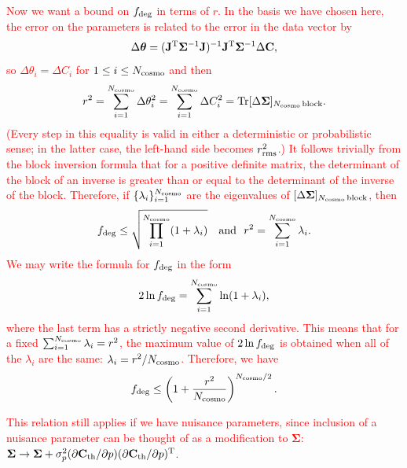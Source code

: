 \documentclass[usenatbib]{mnras}
\newcommand{\changetext}[1]{\textcolor{red}{#1}}
\begin{document}
\changetext{Now we want a bound on $f_{\rm deg}$ in terms of $r$. In the basis we have chosen here, the error on the parameters is related to the error in the data vector by
\begin{equation}
\Delta{\boldsymbol\theta} = ({\bf J}^{\rm T}{\boldsymbol\Sigma}^{-1}{\bf J})^{-1} {\bf J}^{\rm T}{\boldsymbol\Sigma}^{-1}\Delta{\bf C},
\end{equation}
so $\Delta\theta_i = \Delta C_i$ for $1\le i\le N_{\rm cosmo}$ and then
\begin{equation}
r^2 = \sum_{i=1}^{N_{\rm cosmo}} \Delta\theta_i^2 = \sum_{i=1}^{N_{\rm cosmo}} \Delta C_i^2
= {\rm Tr} [\Delta{\boldsymbol\Sigma}]_{N_{\rm cosmo}\,\rm block}.
\end{equation}
(Every step in this equality is valid in either a deterministic or probabilistic sense; in the latter case, the left-hand side becomes $r_{\rm rms}^2$.)
It follows trivially from the block inversion formula that for a positive definite matrix, the determinant of the block of an inverse is greater than or equal to the determinant of the inverse of the block. Therefore, if $\{\lambda_i\}_{i=1}^{N_{\rm cosmo}}$ are the eigenvalues of $[\Delta{\boldsymbol\Sigma}]_{N_{\rm cosmo}\,\rm block}$, then
\begin{equation}
f_{\rm deg} \le \sqrt{ \prod_{i=1}^{N_{\rm cosmo}} (1+\lambda_i)}
~~~{\rm and} ~~
r^2 = \sum_{i=1}^{N_{\rm cosmo}} \lambda_i.
\end{equation}
We may write the formula for $f_{\rm deg}$ in the form
\begin{equation}
2\ln f_{\rm deg} = \sum_{i=1}^{N_{\rm cosmo}} \ln (1+\lambda_i),
\end{equation}
where the last term has a strictly negative second derivative. This means that for a fixed $\sum_{i=1}^{N_{\rm cosmo}} \lambda_i = r^2$, the maximum value of $2\ln f_{\rm deg}$ is obtained when all of the $\lambda_i$ are the same: $\lambda_i = r^2/{N_{\rm cosmo}}$. Therefore, we have
\begin{equation}
f_{\rm deg} \le \left( 1 + \frac{r^2}{N_{\rm cosmo}} \right)^{N_{\rm cosmo}/2}.
\label{eq:fdeg-ineq}
\end{equation}
}

\changetext{This relation still applies if we have nuisance parameters, since inclusion of a nuisance parameter can be thought of as a modification to ${\boldsymbol\Sigma}$: ${\boldsymbol\Sigma} \rightarrow {\boldsymbol\Sigma} + \sigma_p^2 (\partial{\bf C}_{\rm th}/\partial p)(\partial{\bf C}_{\rm th}/\partial p)^{\rm T}$.}
\end{document}
